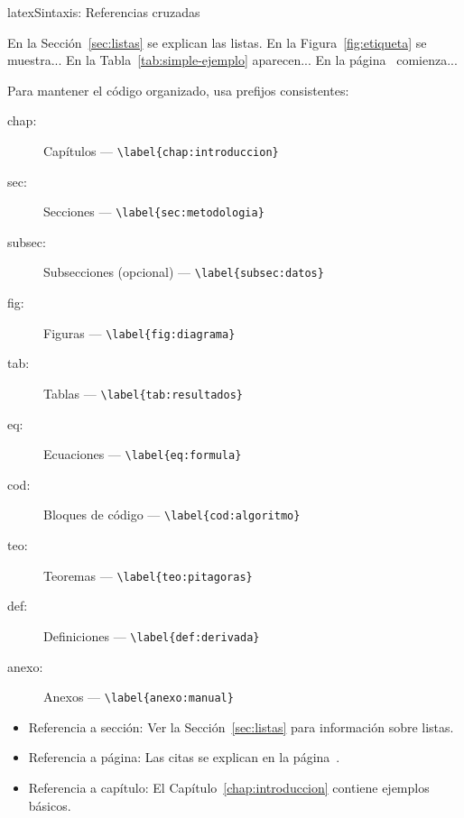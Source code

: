 \begin{codigosimple}{latex}{Sintaxis: Referencias cruzadas}
\label{tipo:nombre}

En la Sección~\ref{sec:listas} se explican las listas.
En la Figura~\ref{fig:etiqueta} se muestra...
En la Tabla~\ref{tab:simple-ejemplo} aparecen...
En la página~\pageref{sec:listas} comienza...
\end{codigosimple}


Para mantener el código organizado, usa prefijos consistentes:

\begin{description}
  \item[chap:] Capítulos --- \verb|\label{chap:introduccion}|
  \item[sec:] Secciones --- \verb|\label{sec:metodologia}|
  \item[subsec:] Subsecciones (opcional) --- \verb|\label{subsec:datos}|
  \item[fig:] Figuras --- \verb|\label{fig:diagrama}|
  \item[tab:] Tablas --- \verb|\label{tab:resultados}|
  \item[eq:] Ecuaciones --- \verb|\label{eq:formula}|
  \item[cod:] Bloques de código --- \verb|\label{cod:algoritmo}|
  \item[teo:] Teoremas --- \verb|\label{teo:pitagoras}|
  \item[def:] Definiciones --- \verb|\label{def:derivada}|
  \item[anexo:] Anexos --- \verb|\label{anexo:manual}|
\end{description}


\begin{itemize}
  \item Referencia a sección: Ver la Sección~\ref{sec:listas} para información sobre listas.
  \item Referencia a página: Las citas se explican en la página~\pageref{sec:citas}.
  \item Referencia a capítulo: El Capítulo~\ref{chap:introduccion} contiene ejemplos básicos.
\end{itemize}

